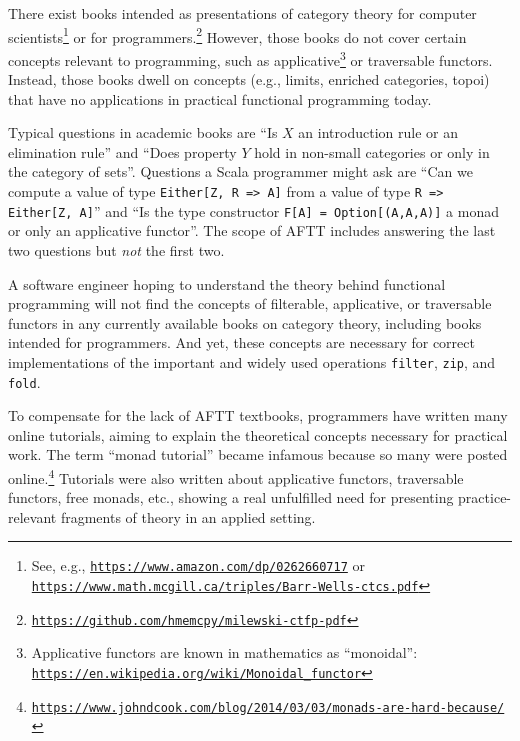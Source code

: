 There exist books intended as presentations of category theory for
computer scientists\footnote{See, e.g., \texttt{\href{https://www.amazon.com/dp/0262660717}{https://www.amazon.com/dp/0262660717}}
or \texttt{\href{https://www.math.mcgill.ca/triples/Barr-Wells-ctcs.pdf}{https://www.math.mcgill.ca/triples/Barr-Wells-ctcs.pdf}}} or for programmers.\footnote{\texttt{\href{https://github.com/hmemcpy/milewski-ctfp-pdf}{https://github.com/hmemcpy/milewski-ctfp-pdf}}}
However, those books do not cover certain concepts relevant to programming,
such as applicative\footnote{Applicative functors are known in mathematics as \textsf{``}monoidal\textsf{''}: \texttt{\href{https://en.wikipedia.org/wiki/Monoidal_functor}{https://en.wikipedia.org/wiki/Monoidal\_functor}}}
or traversable functors. Instead, those books dwell on concepts (e.g.,
limits, enriched categories, topoi) that have no applications in practical
functional programming today.

Typical questions in academic books are \textsf{``}Is $X$ an introduction
rule or an elimination rule\textsf{''} and \textsf{``}Does property $Y$ hold in non-small
categories or only in the category of sets\textsf{''}. Questions a Scala programmer
might ask are \textsf{``}Can we compute a value of type \lstinline!Either[Z, R => A]!
from a value of type \lstinline!R => Either[Z, A]!\textsf{''} and \textsf{``}Is the
type constructor \lstinline!F[A] = Option[(A,A,A)]! a monad or only
an applicative functor\textsf{''}. The scope of AFTT includes answering the
last two questions but \emph{not} the first two.

A software engineer hoping to understand the theory behind functional
programming will not find the concepts of filterable, applicative,
or traversable functors in any currently available books on category
theory, including books intended for programmers. And yet, these concepts
are necessary for correct implementations of the important and widely
used operations \lstinline!filter!, \lstinline!zip!, and \lstinline!fold!.

To compensate for the lack of AFTT textbooks, programmers have written
many online tutorials, aiming to explain the theoretical concepts
necessary for practical work. The term \textsf{``}monad tutorial\textsf{''} became
infamous because so many were  posted online.\footnote{\texttt{\href{https://www.johndcook.com/blog/2014/03/03/monads-are-hard-because/}{https://www.johndcook.com/blog/2014/03/03/monads-are-hard-because/}}}
Tutorials were also written about applicative functors, traversable
functors, free monads, etc., showing a real unfulfilled need for presenting
practice-relevant fragments of theory in an applied setting. 

